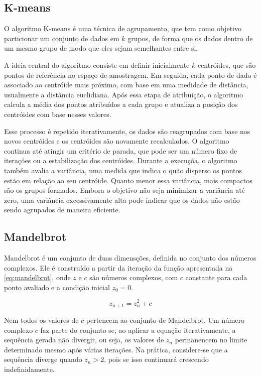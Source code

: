 \subsection{K-means}\label{subsec:kmeans}

O algoritmo K-means é uma técnica de agrupamento, que tem como objetivo particionar um conjunto de dados em $k$ grupos, de forma que os dados dentro de um mesmo grupo de modo que eles sejam semelhantes entre si.

A ideia central do algoritmo consiste em definir inicialmente $k$ centróides, que são pontos de referência no espaço de amostragem. Em seguida, cada ponto de dado é associado ao centróide mais próximo, com base em uma medidade de distância, usualmente a distância euclidiana. Após essa etapa de atribuição, o algoritmo calcula a média dos pontos atribuídos a cada grupo e atualiza a posição dos centróides com base nesses valores.

Esse processo é repetido iterativamente, os dados são reagrupados com base nos novos centróides e os centróides são novamente recalculados. O algoritmo continua até atingir um critério de parada, que pode ser um número fixo de iterações ou a estabilização dos centróides. Durante a execuçõa, o algoritmo também avalia a variância, uma medida que indica o quão disperso os pontos estão em relação ao seu centróide. Quanto menor essa variância, mais compactos são os grupos formados. Embora o objetivo não seja minimizar a variância até zero, uma variância excessivamente alta pode indicar que os dados não estão sendo agrupados de maneira eficiente.

\subsection{Mandelbrot}\label{subsec:mandelbrot}

Mandelbrot é um conjunto de duas dimensções, definida no conjunto dos números complexos. Ele é construído a partir da iteração da função apresentada na \autoref{eq:mandelbrot}, onde $z$ e $c$ são números complexos, com $c$ constante para cada ponto avaliado e a condição inicial $z_0 = 0$.

\begin{equation}
	\label{eq:mandelbrot}
	z_{n + 1} = z_n^{2} + c
\end{equation}

Nem todos os valores de $c$ pertencem ao conjunto de Mandelbrot. Um número complexo $c$ faz parte do conjunto se, ao aplicar a equação iterativamente, a sequência gerada não divergir, ou seja, os valores de $z_n$ permanencem no limite determinado mesmo após várias iterações. Na prática, considere-se que a sequência diverge quando $z_n > 2$, pois se isso continuará crescendo indefinidamente.

